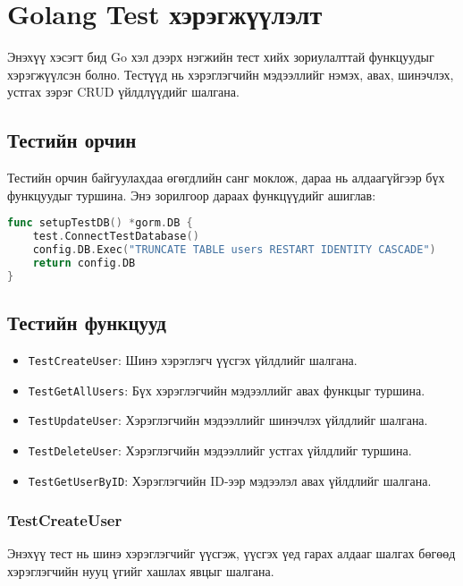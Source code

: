 \section{Golang Test хэрэгжүүлэлт}

Энэхүү хэсэгт бид Go хэл дээрх нэгжийн тест хийх зориулалттай функцуудыг хэрэгжүүлсэн болно. Тестүүд нь хэрэглэгчийн мэдээллийг нэмэх, авах, шинэчлэх, устгах зэрэг CRUD үйлдлүүдийг шалгана.



\subsection{Тестийн орчин}

Тестийн орчин байгуулахдаа өгөгдлийн санг моклож, дараа нь алдаагүйгээр бүх функцуудыг туршина. Энэ зорилгоор дараах функцүүдийг ашиглав:

\begin{lstlisting}[language=Go, caption=Test Database Setup, frame=single]
func setupTestDB() *gorm.DB {
    test.ConnectTestDatabase()
    config.DB.Exec("TRUNCATE TABLE users RESTART IDENTITY CASCADE") 
    return config.DB
}
\end{lstlisting}

\subsection{Тестийн функцууд}

\begin{itemize}
    \item \texttt{TestCreateUser}: Шинэ хэрэглэгч үүсгэх үйлдлийг шалгана.
    \item \texttt{TestGetAllUsers}: Бүх хэрэглэгчийн мэдээллийг авах функцыг туршина.
    \item \texttt{TestUpdateUser}: Хэрэглэгчийн мэдээллийг шинэчлэх үйлдлийг шалгана.
    \item \texttt{TestDeleteUser}: Хэрэглэгчийн мэдээллийг устгах үйлдлийг туршина.
    \item \texttt{TestGetUserByID}: Хэрэглэгчийн ID-ээр мэдээлэл авах үйлдлийг шалгана.
\end{itemize}

\subsubsection{TestCreateUser}

Энэхүү тест нь шинэ хэрэглэгчийг үүсгэж, үүсгэх үед гарах алдааг шалгах бөгөөд хэрэглэгчийн нууц үгийг хашлах явцыг шалгана.

